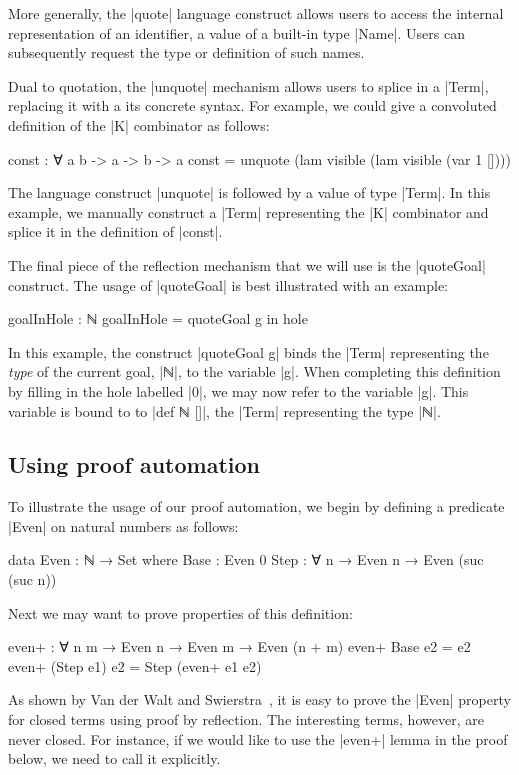 \documentclass[preprint]{sigplanconf}
\begin{document}
More generally, the |quote| language construct allows users to access
the internal representation of an identifier, a value of a built-in
type |Name|. Users can subsequently request the type or definition of
such names.

Dual to quotation, the |unquote| mechanism allows users to splice in a
|Term|, replacing it with a its concrete syntax. For example, we could
give a convoluted definition of the |K| combinator as follows:
\begin{code}
  const : ∀ {a b} -> a  -> b -> a
  const = unquote (lam visible (lam visible (var 1 [])))
\end{code}
The language construct |unquote| is followed by a value of type
|Term|. In this example, we manually construct a |Term| representing
the |K| combinator and splice it in the definition of |const|.

The final piece of the reflection mechanism that we will use is the
|quoteGoal| construct. The usage of |quoteGoal| is best illustrated
with an example:
\begin{code}
  goalInHole : ℕ
  goalInHole = quoteGoal g in hole
\end{code}
In this example, the construct |quoteGoal g| binds the |Term|
representing the \emph{type} of the current goal, |ℕ|, to the variable
|g|. When completing this definition by filling in the hole labelled
|0|, we may now refer to the variable |g|. This variable is bound to
to |def ℕ []|, the |Term| representing the type |ℕ|.

\subsection*{Using proof automation}

To illustrate the usage of our proof automation, we begin by defining a
predicate |Even| on natural numbers as follows:

\begin{code}
  data Even : ℕ → Set where
    Base : Even 0
    Step : ∀ {n} → Even n → Even (suc (suc n))
\end{code}
%
Next we may want to prove properties of this definition:
%
\begin{code}
  even+ : ∀ {n m} → Even n → Even m → Even (n + m)
  even+ Base       e2  = e2
  even+ (Step e1)  e2  = Step (even+ e1 e2)
\end{code}
%
As shown by Van der Walt and Swierstra~\cite{van-der-walt}, it is easy
to prove the |Even| property for closed terms using proof by
reflection. The interesting terms, however, are never closed.  For
instance, if we would like to use the |even+| lemma in the proof
below, we need to call it explicitly.
\end{document}
